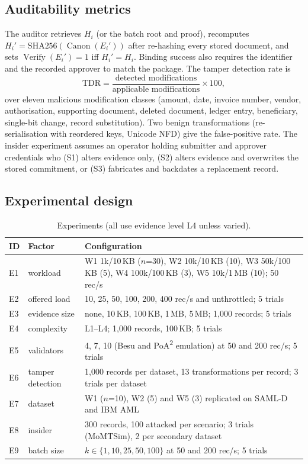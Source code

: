 \documentclass[10pt]{article}
\newcommand{\poa}{PoA\textsuperscript{2}}
\begin{document}
\subsection{Auditability metrics}
The auditor retrieves $H_i$ (or the batch root and proof), recomputes $H_i'=\mathrm{SHA256}(\operatorname{Canon}(E_i'))$
after re-hashing every stored document, and sets $\operatorname{Verify}(E_i')=1$ iff $H_i'=H_i$. Binding success also
requires the identifier and the recorded approver to match the package. The tamper detection rate is
\begin{equation}
\mathrm{TDR}=\frac{\text{detected modifications}}{\text{applicable modifications}}\times100,
\end{equation}
over eleven malicious modification classes (amount, date, invoice number, vendor, authorisation, supporting document,
deleted document, ledger entry, beneficiary, single-bit change, record substitution). Two benign transformations
(re-serialisation with reordered keys, Unicode NFD) give the false-positive rate. The insider experiment assumes an
operator holding submitter and approver credentials who (S1) alters evidence only, (S2) alters evidence and overwrites
the stored commitment, or (S3) fabricates and backdates a replacement record.

\subsection{Experimental design}
\begin{table}[H]
\centering\scriptsize
\caption{Experiments (all use evidence level L4 unless varied).}\label{tab:design}
\begin{tabular}{llp{9.3cm}}
\toprule
ID & Factor & Configuration \\
\midrule
E1 & workload & W1 1k/10\,KB ($n$=30), W2 10k/10\,KB (10), W3 50k/100\,KB (5), W4 100k/100\,KB (3), W5 10k/1\,MB (10); 50 rec/s \\
E2 & offered load & 10, 25, 50, 100, 200, 400 rec/s and unthrottled; 5 trials \\
E3 & evidence size & none, 10\,KB, 100\,KB, 1\,MB, 5\,MB; 1{,}000 records; 5 trials \\
E4 & complexity & L1--L4; 1{,}000 records, 100\,KB; 5 trials \\
E5 & validators & 4, 7, 10 (Besu and \poa{} emulation) at 50 and 200 rec/s; 5 trials \\
E6 & tamper detection & 1{,}000 records per dataset, 13 transformations per record; 3 trials per dataset \\
E7 & dataset & W1 ($n$=10), W2 (5) and W5 (3) replicated on SAML-D and IBM AML \\
E8 & insider & 300 records, 100 attacked per scenario; 3 trials (MoMTSim), 2 per secondary dataset \\
E9 & batch size & $k\in\{1,10,25,50,100\}$ at 50 and 200 rec/s; 5 trials \\
\bottomrule
\end{tabular}
\end{table}
\end{document}

